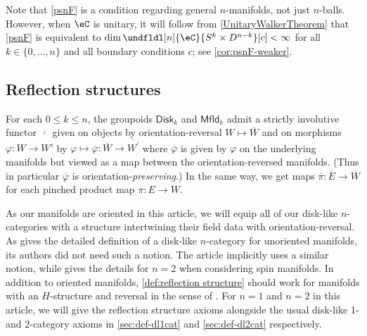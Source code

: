 \documentclass[12pt,reqno]{amsart}
\newcommand{\Mfld}{\mathsf{Mfld}}
\newcommand{\Disk}{\mathsf{Disk}}
\newcommand{\C}{\eC}
\newcommand{\orev}{\overline}
\begin{document}
\begin{remark}
  \label{weakerpsnF}
Note that \ref{psnF} is a condition regarding general $n$-manifolds, not just $n$-balls. However, when $\C$ is unitary, it will follow from \cref{UnitaryWalkerTheorem} that \ref{psnF} is equivalent to $\dim\undfldl[n]{\C}{S^k\times D^{n-k}}[c]<\infty$ for all $k\in\{0,\dots,n\}$ and all boundary conditions $c$; see \cref{cor:psnF-weaker}.
\end{remark}

\subsection{Reflection structures}
\label{dlreflsec}
For each $0\leq k\leq n$, the groupoids $\Disk_k$ and $\Mfld_k$ admit a strictly involutive functor $\orev{\,\cdot\,}$ given on objects by orientation-reversal $W\mapsto \orev{W}$ and on morphisms $\varphi\colon W\to W'$ by $\varphi\mapsto \orev\varphi\colon\orev W\to\orev{W^\prime}$ where $\orev\varphi$ is given by $\varphi$ on the underlying manifolds but viewed as a map between the orientation-reversed manifolds. (Thus in particular $\orev\varphi$ is orientation-\emph{preserving}.) In the same way, we get maps $\orev\pi\colon \orev E\to \orev W$ for each pinched product map $\pi\colon E\to W$. 

As our manifolds are oriented in this article, we will equip all of our disk-like $n$-categories with a structure intertwining their field data with orientation-reversal. As \cite{MW12} gives the detailed definition of a disk-like $n$-category for unoriented manifolds, its authors did not need such a notion. The article \cite{W21} implicitly uses a similar notion, while \cite{W17aasen} gives the details for $n=2$ when considering spin manifolds. In addition to oriented manifolds, \cref{def:reflection structure} should work for manifolds with an $H$-structure and reversal in the sense of \cite{FH21}. For $n=1$ and $n=2$ in this article, we will give the reflection structure axioms alongside the usual disk-like 1- and 2-category axioms in \cref{sec:def-dl1cat} and \cref{sec:def-dl2cat} respectively.
\end{document}
